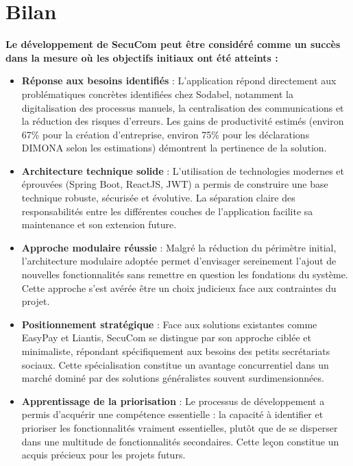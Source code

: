 \section*{Bilan}

\textbf{Le développement de SecuCom peut être considéré comme un succès dans la mesure où les objectifs initiaux ont été atteints :}

\begin{itemize}[leftmargin=*,label=\textcolor{darkgray}{$\bullet$},itemsep=0.3em]
  \item \textbf{Réponse aux besoins identifiés} : L'application répond directement aux problématiques concrètes identifiées chez Sodabel, notamment la digitalisation des processus manuels, la centralisation des communications et la réduction des risques d'erreurs. Les gains de productivité estimés (environ 67\% pour la création d'entreprise, environ 75\% pour les déclarations DIMONA selon les estimations) démontrent la pertinence de la solution.

  \item \textbf{Architecture technique solide} : L'utilisation de technologies modernes et éprouvées (Spring Boot, ReactJS, JWT) a permis de construire une base technique robuste, sécurisée et évolutive. La séparation claire des responsabilités entre les différentes couches de l'application facilite sa maintenance et son extension future.

  \item \textbf{Approche modulaire réussie} : Malgré la réduction du périmètre initial, l'architecture modulaire adoptée permet d'envisager sereinement l'ajout de nouvelles fonctionnalités sans remettre en question les fondations du système. Cette approche s'est avérée être un choix judicieux face aux contraintes du projet.

  \item \textbf{Positionnement stratégique} : Face aux solutions existantes comme EasyPay et Liantis, SecuCom se distingue par son approche ciblée et minimaliste, répondant spécifiquement aux besoins des petits secrétariats sociaux. Cette spécialisation constitue un avantage concurrentiel dans un marché dominé par des solutions généralistes souvent surdimensionnées.

  \item \textbf{Apprentissage de la priorisation} : Le processus de développement a permis d'acquérir une compétence essentielle : la capacité à identifier et prioriser les fonctionnalités vraiment essentielles, plutôt que de se disperser dans une multitude de fonctionnalités secondaires. Cette leçon constitue un acquis précieux pour les projets futurs.
\end{itemize}


